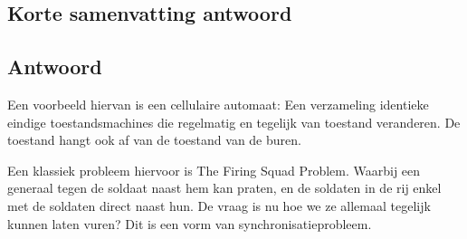 \documentclass{article}
\begin{document}
    \subsection{Korte samenvatting antwoord}
        
    \subsection{Antwoord}
        Een voorbeeld hiervan is een cellulaire automaat: Een verzameling identieke eindige toestandsmachines die regelmatig en tegelijk van toestand veranderen. De toestand hangt ook af van de toestand van de buren.

        Een klassiek probleem hiervoor is The Firing Squad Problem. Waarbij een generaal tegen de soldaat naast hem kan praten, en de soldaten in de rij enkel met de soldaten direct naast hun. De vraag is nu hoe we ze allemaal tegelijk kunnen laten vuren? Dit is een vorm van synchronisatieprobleem.
\end{document}
